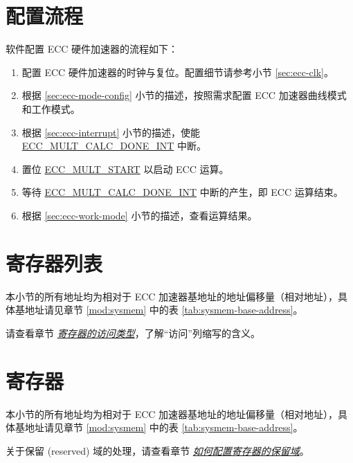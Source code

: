 \documentclass[main\_\_CN.tex]{subfiles}
\begin{document}

\section{配置流程}

软件配置 ECC 硬件加速器的流程如下：

\begin{enumerate}
    \item 配置 ECC 硬件加速器的时钟与复位。配置细节请参考小节 \ref{sec:ecc-clk}。
    \item 根据 \ref{sec:ecc-mode-config} 小节的描述，按照需求配置 ECC 加速器曲线模式和工作模式。
    \item 根据 \ref{sec:ecc-interrupt} 小节的描述，使能 \hyperref[int:ECCMULTCALCDONEINT]{ECC\_MULT\_CALC\_DONE\_INT} 中断。
    \item 置位 \hyperref[fielddesc:ECCMULTSTART]{ECC\_MULT\_START} 以启动 ECC 运算。
    \item 等待 \hyperref[int:ECCMULTCALCDONEINT]{ECC\_MULT\_CALC\_DONE\_INT} 中断的产生，即 ECC 运算结束。
    \item 根据 \ref{sec:ecc-work-mode} 小节的描述，查看运算结果。
\end{enumerate}





\newpage
\hypertarget{ecc-reg-summ}{}
\section{寄存器列表}
\label{sec:ecc-reg-summ}

本小节的所有地址均为相对于 ECC 加速器基地址的地址偏移量（相对地址），具体基地址请见章节 \ref{mod:sysmem} \textit{} 中的表 \ref{tab:sysmem-base-address}。

请查看章节 \hyperref[glossary-access-types]{\textit{寄存器的访问类型}}，了解“访问”列缩写的含义。






\newpage
\section{寄存器}

本小节的所有地址均为相对于 ECC 加速器基地址的地址偏移量（相对地址），具体基地址请见章节 \ref{mod:sysmem} \textit{} 中的表 \ref{tab:sysmem-base-address}。

关于保留 (reserved) 域的处理，请查看章节 \hyperref[programming-reserved-field]{\textit{如何配置寄存器的保留域}}。


\end{document}

